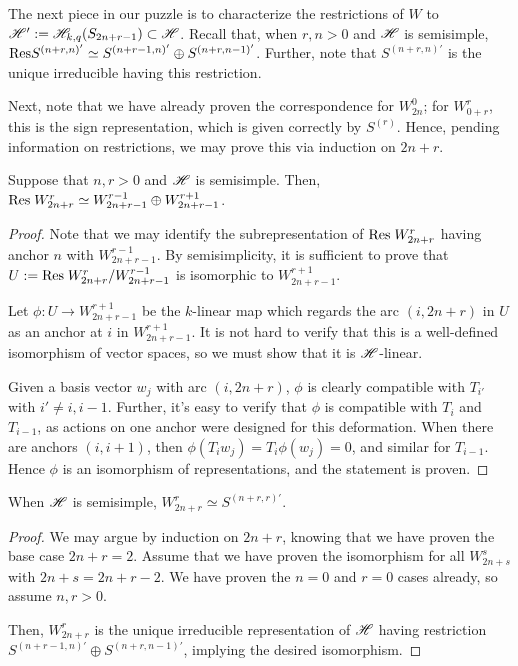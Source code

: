 \documentclass{amsart}
\begin{document}
The next piece in our puzzle is to characterize the restrictions of $W$ to $\mathscr{H}' := \mathscr{H}_{k,q}(S_{2n + r - 1}) \subset \mathscr{H}$.
Recall that, when $r,n>0$ and $\mathscr{H}$ is semisimple,  $\text{Res} S^{(n+r,n)'} \simeq S^{(n+r-1,n)'} \oplus S^{(n+r,n-1)'}$.
Further, note that $S^{(n+r,n)'}$ is the unique irreducible having this restriction.

Next, note that we have already proven the correspondence for $W_{2n}^0$;
for $W_{0 + r}^{r}$, this is the sign representation, which is given correctly by $S^{(r)}$.
Hence, pending information on restrictions, we may prove this via induction on $2n + r$.

\begin{proposition}
  Suppose that $n,r > 0$ and $\mathscr{H}$ is semisimple.
  Then, $\text{Res} \; W_{2n + r}^r \simeq W_{2n + r - 1}^{r-1} \oplus W_{2n + r - 1}^{r + 1}$.
\end{proposition}
\begin{proof}
  Note that we may identify the subrepresentation of $\text{Res} \; W_{2n + r}^r$ having anchor $n$ with $W_{2n + r - 1}^{r-1}$.
  By semisimplicity, it is sufficient to prove that $U := \text{Res} \; W_{2n + r}^r / W_{2n + r - 1}^{r-1}$ is isomorphic to $W_{2n + r - 1}^{r +1}$.

  Let $\phi:U \rightarrow W_{2n + r - 1}^{r + 1}$ be the $k$-linear map which regards the arc $(i,2n + r)$ in $U$ as an anchor at $i$ in $W_{2n + r - 1}^{r + 1}$.
  It is not hard to verify that this is a well-defined isomorphism of vector spaces, so we must show that it is $\mathscr{H}$-linear.

  Given a basis vector $w_j$ with arc $(i,2n + r)$, $\phi$ is clearly compatible with $T_{i'}$ with $i' \neq i,i-1$.
  Further, it's easy to verify that $\phi$ is compatible with $T_{i}$ and $T_{i-1}$, as actions on one anchor were designed for this deformation.
  When there are anchors $(i,i+1)$, then $\phi(T_iw_j) = T_i\phi(w_j) = 0$, and similar for $T_{i -1}$.
  Hence $\phi$ is an isomorphism of representations, and the statement is proven.
\end{proof}

\begin{corollary}
  When $\mathscr{H}$ is semisimple, $W_{2n + r}^r \simeq S^{(n + r,r)'}$.
\end{corollary}
\begin{proof}
  We may argue by induction on $2n + r$, knowing that we have proven the base case $2n + r = 2$.
  Assume that we have proven the isomorphism for all $W_{2n + s}^{s}$ with $2n + s = 2n + r - 2$.
  We have proven the $n = 0$ and $r = 0$ cases already, so assume $n,r > 0$.
  
  Then, $W_{2n + r}^{r}$ is the unique irreducible representation of $\mathscr{H}$ having restriction $S^{(n+r-1,n)'} \oplus S^{(n + r,n-1)'}$, implying the desired isomorphism.
\end{proof}
\end{document}

